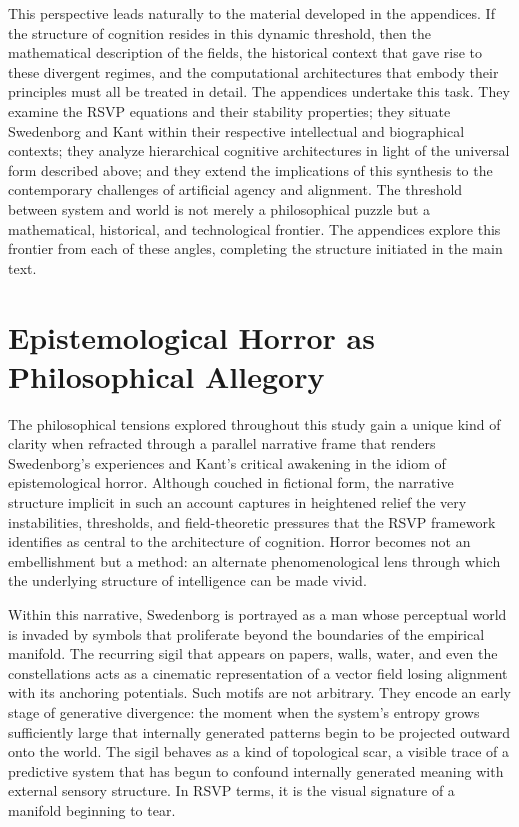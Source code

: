 \documentclass[12pt]{article}
\begin{document}
This perspective leads naturally to the material developed in the appendices.  
If the structure of cognition resides in this dynamic threshold, then the 
mathematical description of the fields, the historical context that gave rise 
to these divergent regimes, and the computational architectures that embody 
their principles must all be treated in detail. The appendices undertake this 
task. They examine the RSVP equations and their stability properties; they 
situate Swedenborg and Kant within their respective intellectual and biographical 
contexts; they analyze hierarchical cognitive architectures in light of the 
universal form described above; and they extend the implications of this 
synthesis to the contemporary challenges of artificial agency and alignment.  
The threshold between system and world is not merely a philosophical puzzle but 
a mathematical, historical, and technological frontier. The appendices explore 
this frontier from each of these angles, completing the structure initiated in 
the main text.

\newpage
\section{Epistemological Horror as Philosophical Allegory}

The philosophical tensions explored throughout this study gain a unique kind of 
clarity when refracted through a parallel narrative frame that renders 
Swedenborg’s experiences and Kant’s critical awakening in the idiom of 
epistemological horror. Although couched in fictional form, the narrative 
structure implicit in such an account captures in heightened relief the very 
instabilities, thresholds, and field-theoretic pressures that the RSVP framework 
identifies as central to the architecture of cognition. Horror becomes not an 
embellishment but a method: an alternate phenomenological lens through which the 
underlying structure of intelligence can be made vivid.

Within this narrative, Swedenborg is portrayed as a man whose perceptual world 
is invaded by symbols that proliferate beyond the boundaries of the empirical 
manifold. The recurring sigil that appears on papers, walls, water, and even the 
constellations acts as a cinematic representation of a vector field losing 
alignment with its anchoring potentials. Such motifs are not arbitrary. They 
encode an early stage of generative divergence: the moment when the system’s 
entropy grows sufficiently large that internally generated patterns begin to be 
projected outward onto the world. The sigil behaves as a kind of topological 
scar, a visible trace of a predictive system that has begun to confound 
internally generated meaning with external sensory structure. In RSVP terms, it 
is the visual signature of a manifold beginning to tear.
\end{document}
